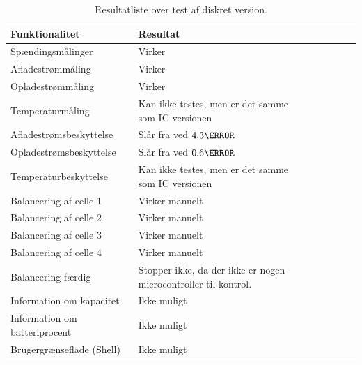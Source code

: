 \begin{table}[h!]
	\small
	\centering
	\begin{threeparttable}
		\begin{tabular}{ l l l l l l l }
			\toprule
			\multicolumn{1}{l}{\textbf{Funktionalitet}}          &
			\multicolumn{1}{l}{\textbf{Resultat}}           \\
			\hline
			Spændingsmålinger              & Virker                         \\
			Afladestrømmåling                    		& Virker                         \\
			Opladestrømmåling                    		& Virker                         \\
			Temperaturmåling                    		& Kan ikke testes, men er det samme som IC versionen    \\
			Afladestrømsbeskyttelse		& Slår fra ved $4.3\ampere$        \\
			Opladestrømsbeskyttelse   	& Slår fra ved $0.6\ampere$      \\
			Temperaturbeskyttelse          & Kan ikke testes, men er det samme som IC versionen          \\
			Balancering af celle 1         & Virker manuelt                         \\
			Balancering af celle 2        & Virker manuelt                        \\
			Balancering af celle 3        & Virker manuelt                        \\			
			Balancering af celle 4        & Virker manuelt                        \\
			Balancering færdig             & Stopper ikke, da der ikke er nogen microcontroller til kontrol.               \\
			Information om kapacitet       & Ikke muligt                          \\
			Information om batteriprocent 							& Ikke muligt			 \\
			Brugergrænseflade (Shell)                       & Ikke muligt                    \\
			
			\bottomrule
		\end{tabular}
		\caption{Resultatliste over test af diskret version.}
		\label{tab:resultat_diskret}
	\end{threeparttable}
\end{table} 
\FloatBlock

